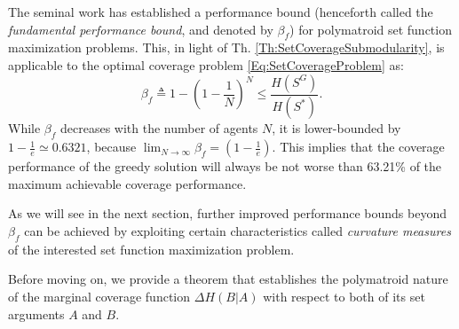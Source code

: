 \documentclass[letterpaper, 10 pt, conference]{ieeeconf}
\newcommand{\R}{\mathbb{R}}
\newtheorem{lemma}{Lemma}
\begin{document}
The seminal work \cite{Nemhauser1978} has established a performance bound (henceforth called the \emph{fundamental performance bound}, and denoted by $\beta_f$) for polymatroid set function maximization problems. This, in light of Th. \ref{Th:SetCoverageSubmodularity}, is applicable to the optimal coverage problem \eqref{Eq:SetCoverageProblem} as: 
\begin{equation}\label{Eq:FundamentalPerformanceBound}
    \beta_f \triangleq 1-\left(1-\frac{1}{N}\right)^N \leq \frac{H(S^G)}{H(S^*)}.
\end{equation}
While $\beta_f$ decreases with the number of agents $N$, it is lower-bounded by $1-\frac{1}{e} \simeq 0.6321$, because $\lim_{N\rightarrow\infty} \beta_f = (1-\frac{1}{e})$. This implies that the coverage performance of the greedy solution will always be not worse than 63.21\% of the maximum achievable coverage performance.

As we will see in the next section, further improved performance bounds beyond $\beta_f$ can be achieved by exploiting certain characteristics called \emph{curvature measures} of the interested set function maximization problem. 


Before moving on, we provide a theorem that establishes the polymatroid nature of the marginal coverage function $\Delta H (B \vert A)$ with respect to both of its set arguments $A$ and $B$. 

\end{document}
